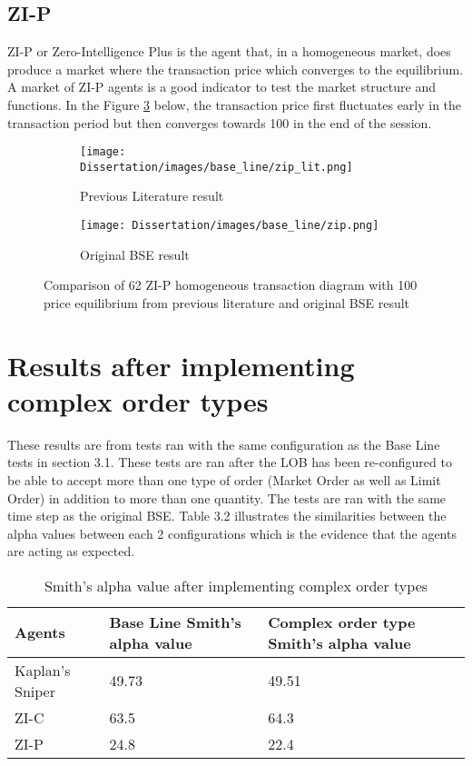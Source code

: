\subsection{ZI-P}
ZI-P or Zero-Intelligence Plus is the agent that, in a homogeneous market, does produce a market where the transaction price which converges to the equilibrium. A market of ZI-P agents is a good indicator to test the market structure and functions. In the Figure \ref{fig:ZIP_org_all} below, the transaction price first fluctuates early in the transaction period but then converges towards 100 in the end of the session.  

\begin{figure}[h]
  \begin{subfigure}[b]{0.5\textwidth}
    \texttt{[image: Dissertation/images/base\_line/zip\_lit.png]}
    \caption{Previous Literature result \cite{BSE_lit}} 
    \label{fig:1}
  \end{subfigure}
  \begin{subfigure}[b]{0.5\textwidth}
    \texttt{[image: Dissertation/images/base\_line/zip.png]}
    \caption{Original BSE result}
    \label{fig:2}
  \end{subfigure}
\caption{Comparison of 62 ZI-P homogeneous transaction diagram with 100 price equilibrium from previous literature and original BSE result} 
\label{fig:ZIP_org_all}
\end{figure}
\FloatBarrier


\section{Results after implementing complex order types} 
These results are from tests ran with the same configuration as the Base Line tests in section 3.1. These tests are ran after the LOB has been re-configured to be able to accept more than one type of order (Market Order as well as Limit Order) in addition to more than one quantity. The tests are ran with the same time step as the original BSE. Table 3.2 illustrates the similarities between the alpha values between each 2 configurations which is the evidence that the agents are acting as expected.  

\begin{table}[h]
\centering
\begin{tabular}{ |m||p{4cm}|p{4cm}|} 
\hline
\textbf{Agents}& \textbf{Base Line Smith's alpha value}& \textbf{Complex order type Smith's alpha value} \\
\hline
\hline
Kaplan's Sniper & 49.73  & 49.51 \\ 
\hline
ZI-C  & 63.5 & 64.3\\ 
\hline
ZI-P & 24.8 & 22.4 \\ 
\hline
\end{tabular}
\caption{Smith's alpha value after implementing complex order types}  
\end{table}
\FloatBarrier


